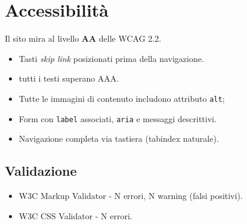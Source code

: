 \documentclass{article}
\begin{document}
\section{Accessibilità}
Il sito mira al livello \textbf{AA} delle WCAG 2.2.

\begin{itemize}
    \item Tasti \emph{skip link} posizionati prima della navigazione.
    \item tutti i testi superano AAA.
    \item Tutte le immagini di contenuto includono attributo \texttt{alt};
    \item Form con \texttt{label} associati, \texttt{aria} e messaggi descrittivi.
    \item Navigazione completa via tastiera (tabindex naturale).
\end{itemize}


\subsection{Validazione}
\begin{itemize}
    \item W3C Markup Validator - N errori, N warning (falsi positivi).
    \item W3C CSS Validator - N errori.
\end{itemize}
\end{document}
